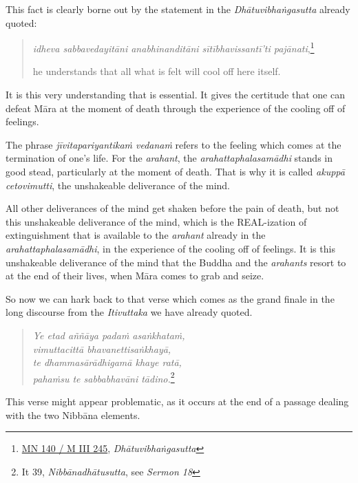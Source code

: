 This fact is clearly borne out by the statement in the \emph{Dhātuvibhaṅgasutta} already quoted:

\begin{quote}
\emph{idheva sabbavedayitāni anabhinanditāni sītībhavissantī'ti pajānati},\footnote{\href{https://suttacentral.net/mn140/pli/ms}{MN 140 / M III 245}, \emph{Dhātuvibhaṅgasutta}}

he understands that all what is felt will cool off here itself.
\end{quote}

It is this very understanding that is essential. It gives the certitude that one can defeat Māra at the moment of death through the experience of the cooling off of feelings.

The phrase \emph{jīvitapariyantikaṁ vedanaṁ} refers to the feeling which comes at the termination of one's life. For the \emph{arahant}, the \emph{arahattaphalasamādhi} stands in good stead, particularly at the moment of death. That is why it is called \emph{akuppā cetovimutti}, the unshakeable deliverance of the mind.

All other deliverances of the mind get shaken before the pain of death, but not this unshakeable deliverance of the mind, which is the REAL-ization of extinguishment that is available to the \emph{arahant} already in the \emph{arahattaphalasamādhi}, in the experience of the cooling off of feelings. It is this unshakeable deliverance of the mind that the Buddha and the \emph{arahants} resort to at the end of their lives, when Māra comes to grab and seize.

So now we can hark back to that verse which comes as the grand finale in the long discourse from the \emph{Itivuttaka} we have already quoted.

\begin{quote}
\emph{Ye etad aññāya padaṁ asaṅkhataṁ,}\\
\emph{vimuttacittā bhavanettisaṅkhayā,}\\
\emph{te dhammasārādhigamā khaye ratā,}\\
\emph{pahaṁsu te sabbabhavāni tādino.}\footnote{It 39, \emph{Nibbānadhātusutta}, see \emph{Sermon 18}}
\end{quote}

This verse might appear problematic, as it occurs at the end of a passage dealing with the two Nibbāna elements.

